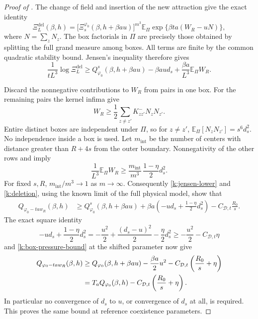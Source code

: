 \begin{proof}[Proof of ]
The change of field and insertion of the new attraction give the exact
identity
\begin{equation}
 \Xi_L^{\mathrm{del}}(\beta,h)
 =\bigl[\Xi_s^{\varphi_0}(\beta,h+\beta au)\bigr]^{m^3}
       \mathbb E_\Pi
       \exp\{\beta ta(W_R-uN)\},
 \label{k:jensen-identity}
\end{equation}
where $N=\sum_zN_z$.  The box factorials in $\Pi$ are precisely those
obtained by splitting the full grand measure among boxes.  All terms
are finite by the common quadratic stability bound.  Jensen's inequality
therefore gives
\begin{equation}
 \frac1{tL^3}\log\Xi_L^{\mathrm{del}}
 \ge Q^s_{\varphi_0}(\beta,h+\beta au)
       -\beta au d_s+\frac{\beta a}{L^3}\mathbb E_\Pi W_R.
 \label{k:jensen-lower}
\end{equation}

Discard the nonnegative contributions to $W_R$ from pairs in one box.
For the remaining pairs the kernel infima give
\[
 W_R\ge\frac12\sum_{z\ne z'}K^-_{zz'}N_zN_{z'}.
\]
Entire distinct boxes are independent under $\Pi$, so for $z\ne z'$,
$\mathbb E_\Pi[N_zN_{z'}]=s^6d_s^2$.  No independence inside a box is
used.  Let $m_{\mathrm{int}}$ be the number of centers with distance
greater than $R+4s$ from the outer boundary.  Nonnegativity of the other
rows and  imply
\[
 \frac1{L^3}\mathbb E_\Pi W_R
 \ge\frac{m_{\mathrm{int}}}{m^3}\,
                    \frac{1-\eta}{2}d_s^2.
\]
For fixed $s,R$, $m_{\mathrm{int}}/m^3\to1$ as $m\to\infty$.
Consequently \eqref{k:jensen-lower} and \eqref{k:deletion}, using the
known limit of the full physical model, show that
\begin{align*}
 Q_{\varphi_0-ta w_R}(\beta,h)
 &\ge Q^s_{\varphi_0}(\beta,h+\beta au)
       +\beta a\left(-u d_s+\frac{1-\eta}{2}d_s^2\right)
       -C_{\mathcal D,t}\frac{R_0}{s}.
\end{align*}
The exact square identity
\begin{equation}
 -u d_s+\frac{1-\eta}{2}d_s^2
 =-\frac{u^2}{2}+\frac{(d_s-u)^2}{2}-\frac\eta2d_s^2
 \ge-\frac{u^2}{2}-C_{\mathcal D,t}\eta
 \label{k:mean-square}
\end{equation}
and \eqref{k:box-pressure-bound} at the shifted parameter now give
\begin{align}
 Q_{\varphi_0-ta w_R}(\beta,h)
 &\ge Q_{\varphi_0}(\beta,h+\beta au)-\frac{\beta a}{2}u^2
       -C_{\mathcal D,t}\left(\frac{R_0}{s}+\eta\right)\notag\\
 &=T_aQ_{\varphi_0}(\beta,h)
       -C_{\mathcal D,t}\left(\frac{R_0}{s}+\eta\right).
 \label{k:lower-final}
\end{align}
In particular no convergence of $d_s$ to $u$, or convergence of $d_s$
at all, is required.  This proves the same bound at reference coexistence
parameters.


\end{proof}
